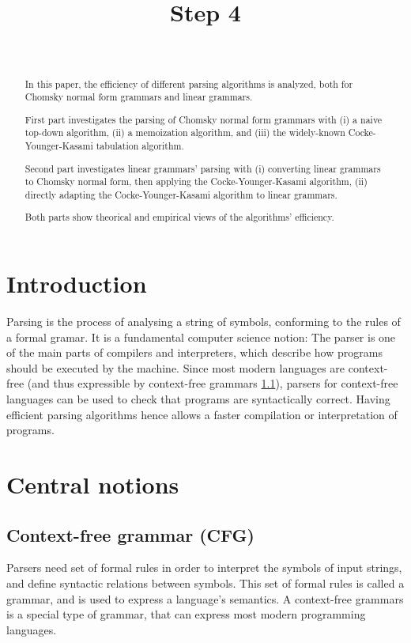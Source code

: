 \documentclass[]{article}
\title{Step 4}
\author{\hwname \\ \hwemail}
\begin{document}
\maketitle
\tableofcontents

\newpage
\begin{multicols}{2}
\begin{abstract}
  In this paper, the efficiency of different parsing algorithms is analyzed,
  both for Chomsky normal form grammars and linear grammars.

  First part investigates the parsing of Chomsky normal form grammars with
  (i) a naive top-down algorithm, (ii) a memoization algorithm, and (iii) the
  widely-known Cocke-Younger-Kasami tabulation algorithm.

  Second part investigates linear grammars' parsing with (i) converting linear
  grammars to Chomsky normal form, then applying the Cocke-Younger-Kasami
  algorithm, (ii) directly adapting the Cocke-Younger-Kasami algorithm to linear grammars.

  Both parts show theorical and empirical views of the algorithms' efficiency.
\end{abstract}

\section*{Introduction}
Parsing is the process of analysing a string of symbols, conforming to the rules
of a formal gramar.
It is a fundamental computer science notion: The parser is one of the main
parts of compilers and interpreters, which describe how programs should be executed by
the machine. Since most modern languages are context-free (and thus expressible
by context-free grammars \ref{cfg}), parsers for context-free languages can be
used to check that programs are syntactically correct.
Having efficient parsing algorithms hence allows a faster compilation or
interpretation of programs.

\section{Central notions}
\subsection{Context-free grammar (CFG)} \label{cfg}
Parsers need set of formal rules in order to interpret the symbols of input
strings, and define syntactic
relations between symbols. This set of formal rules is called a grammar, and
is used to express a language's semantics.
A context-free grammars is a special type of grammar, that can
express most modern programming languages.


\end{multicols}
\end{document}
